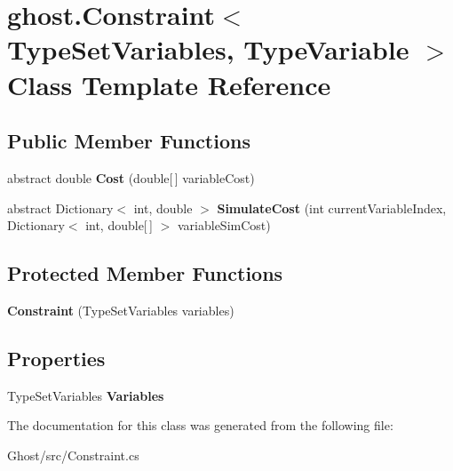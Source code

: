 \hypertarget{classghost_1_1Constraint_3_01TypeSetVariables_00_01TypeVariable_01_4}{\section{ghost.\-Constraint$<$ Type\-Set\-Variables, Type\-Variable $>$ Class Template Reference}
\label{classghost_1_1Constraint_3_01TypeSetVariables_00_01TypeVariable_01_4}
}
\subsection*{Public Member Functions}
\begin{DoxyCompactItemize}
\item 
\hypertarget{classghost_1_1Constraint_3_01TypeSetVariables_00_01TypeVariable_01_4_ac4aba3edfc75f14a974cf45c9a4fbe0d}{abstract double {\bfseries Cost} (double\mbox{[}$\,$\mbox{]} variable\-Cost)}\label{classghost_1_1Constraint_3_01TypeSetVariables_00_01TypeVariable_01_4_ac4aba3edfc75f14a974cf45c9a4fbe0d}

\item 
\hypertarget{classghost_1_1Constraint_3_01TypeSetVariables_00_01TypeVariable_01_4_a5ac6b63a92e54e8812bcdd414763d852}{abstract Dictionary$<$ int, double $>$ {\bfseries Simulate\-Cost} (int current\-Variable\-Index, Dictionary$<$ int, double\mbox{[}$\,$\mbox{]} $>$ variable\-Sim\-Cost)}\label{classghost_1_1Constraint_3_01TypeSetVariables_00_01TypeVariable_01_4_a5ac6b63a92e54e8812bcdd414763d852}

\end{DoxyCompactItemize}
\subsection*{Protected Member Functions}
\begin{DoxyCompactItemize}
\item 
\hypertarget{classghost_1_1Constraint_3_01TypeSetVariables_00_01TypeVariable_01_4_af5f29309c2d8a5874f8e89d9237ae156}{{\bfseries Constraint} (Type\-Set\-Variables variables)}\label{classghost_1_1Constraint_3_01TypeSetVariables_00_01TypeVariable_01_4_af5f29309c2d8a5874f8e89d9237ae156}

\end{DoxyCompactItemize}
\subsection*{Properties}
\begin{DoxyCompactItemize}
\item 
\hypertarget{classghost_1_1Constraint_3_01TypeSetVariables_00_01TypeVariable_01_4_a22327beeea2a2d774f85477a9fdd7b55}{Type\-Set\-Variables {\bfseries Variables}}\label{classghost_1_1Constraint_3_01TypeSetVariables_00_01TypeVariable_01_4_a22327beeea2a2d774f85477a9fdd7b55}

\end{DoxyCompactItemize}


The documentation for this class was generated from the following file\-:\begin{DoxyCompactItemize}
\item 
Ghost/src/Constraint.\-cs\end{DoxyCompactItemize}
